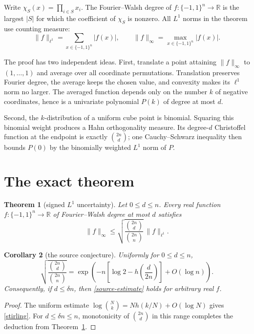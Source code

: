 \documentclass[11pt]{article}
\newtheorem{theorem}{Theorem}
\newtheorem{corollary}[theorem]{Corollary}
\newcommand{\Q}{\{-1,1\}}
\newcommand{\R}{\mathbb R}
\begin{document}
Write $\chi_S(x)=\prod_{i\in S}x_i$.  The Fourier--Walsh degree of
$f:\Q^n\to\R$ is the largest $|S|$ for which the coefficient of
$\chi_S$ is nonzero.  All $L^1$ norms in the theorem use counting measure:
\[
 \|f\|_{\ell^1}=\sum_{x\in\Q^n}|f(x)|,
 \qquad \|f\|_\infty=\max_{x\in\Q^n}|f(x)|.
\]

The proof has two independent ideas.  First, translate a point attaining
$\|f\|_\infty$ to $(1,\ldots,1)$ and average over all coordinate
permutations.  Translation preserves Fourier degree, the average keeps the
chosen value, and convexity makes its $\ell^1$ norm no larger.  The averaged
function depends only on the number $k$ of negative coordinates, hence is a
univariate polynomial $P(k)$ of degree at most $d$.

Second, the $k$-distribution of a uniform cube point is binomial.  Squaring
this binomial weight produces a Hahn orthogonality measure.  Its degree-$d$
Christoffel function at the endpoint is exactly $\binom{2n}{d}$; one
Cauchy--Schwarz inequality then bounds $P(0)$ by the binomially weighted
$L^1$ norm of $P$.

\section{The exact theorem}

\begin{theorem}[signed $L^1$ uncertainty]\label{main}
Let $0\le d\le n$.  Every real function $f:\Q^n\to\R$ of
Fourier--Walsh degree at most $d$ satisfies
\begin{equation}\label{finite}
 \boxed{\quad
 \|f\|_\infty\le
 \sqrt{\frac{\binom{2n}{d}}{\binom{2n}{n}}}\,
 \|f\|_{\ell^1}.
 \quad}
\end{equation}
\end{theorem}

\begin{corollary}[the source conjecture]\label{asymptotic}
Uniformly for $0\le d\le n$,
\begin{equation}\label{stirling}
 \sqrt{\frac{\binom{2n}{d}}{\binom{2n}{n}}}
 =\exp\!\left(-n\left[\log2-h\left(\frac{d}{2n}\right)\right]
       +O(\log n)\right).
\end{equation}
Consequently, if $d\le\delta n$, then \eqref{source-estimate} holds for
arbitrary real $f$.
\end{corollary}

\begin{proof}
The uniform estimate
$\log\binom Nk=Nh(k/N)+O(\log N)$ gives \eqref{stirling}.
For $d\le\delta n\le n$, monotonicity of $\binom{2n}{d}$ in this range
completes the deduction from Theorem~\ref{main}.
\end{proof}
\end{document}
